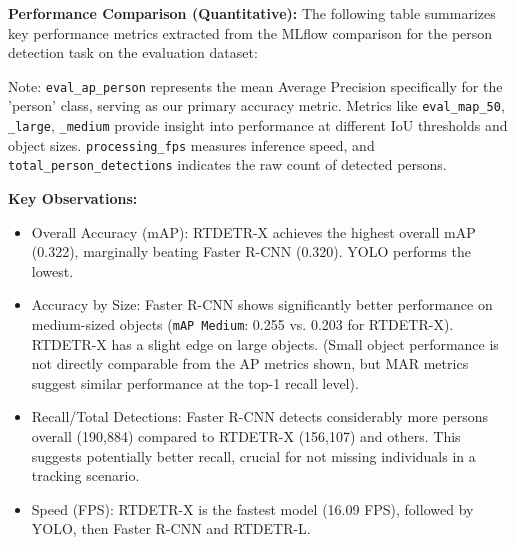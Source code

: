 \textbf{Performance Comparison (Quantitative):}
The following table summarizes key performance metrics extracted from the MLflow comparison for the person detection task on the evaluation dataset:

\begin{table}[!htb]
  \centering
  \caption{Performance Comparison of Person Detection Models}
  \label{tab:model_performance_comparison}
  \par\medskip\footnotesize
  Note: \texttt{eval\_ap\_person} represents the mean Average Precision specifically for the 'person' class, serving as our primary accuracy metric. Metrics like \texttt{eval\_map\_50}, \texttt{\_large}, \texttt{\_medium} provide insight into performance at different IoU thresholds and object sizes. \texttt{processing\_fps} measures inference speed, and \texttt{total\_person\_detections} indicates the raw count of detected persons.
\end{table}

\textbf{Key Observations:}
\begin{itemize}
    \item Overall Accuracy (mAP): RTDETR-X achieves the highest overall mAP (0.322), marginally beating Faster R-CNN (0.320). YOLO performs the lowest.
    \item Accuracy by Size: Faster R-CNN shows significantly better performance on medium-sized objects (\texttt{mAP Medium}: 0.255 vs. 0.203 for RTDETR-X). RTDETR-X has a slight edge on large objects. (Small object performance is not directly comparable from the AP metrics shown, but MAR metrics suggest similar performance at the top-1 recall level).
    \item Recall/Total Detections: Faster R-CNN detects considerably more persons overall (190,884) compared to RTDETR-X (156,107) and others. This suggests potentially better recall, crucial for not missing individuals in a tracking scenario.
    \item Speed (FPS): RTDETR-X is the fastest model (16.09 FPS), followed by YOLO, then Faster R-CNN and RTDETR-L.
\end{itemize}

